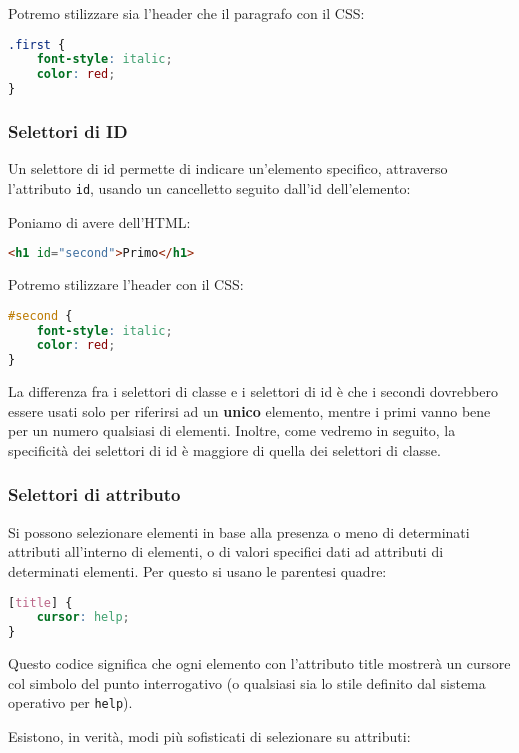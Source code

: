\documentclass[a4paper,11pt]{article}
\begin{document}
Potremo stilizzare sia l'header che il paragrafo con il CSS:
\begin{lstlisting}[language=css, style=codestyle]	
.first {
	font-style: italic;
	color: red;
}
\end{lstlisting}

\subsubsection{Selettori di ID}
Un selettore di id permette di indicare un'elemento specifico, attraverso l'attributo \lstinline|id|, usando un cancelletto seguito dall'id dell'elemento:

Poniamo di avere dell'HTML:
\begin{lstlisting}[language=html, style=codestyle]	
<h1 id="second">Primo</h1>
\end{lstlisting}

Potremo stilizzare l'header con il CSS:
\begin{lstlisting}[language=css, style=codestyle]	
#second {
	font-style: italic;
	color: red;
}
\end{lstlisting}

\par\medskip 

La differenza fra i selettori di classe e i selettori di id è che i secondi dovrebbero essere usati solo per riferirsi ad un \textbf{unico} elemento, mentre i primi vanno bene per un numero qualsiasi di elementi.
Inoltre, come vedremo in seguito, la specificità dei selettori di id è maggiore di quella dei selettori di classe.

\subsubsection{Selettori di attributo}
Si possono selezionare elementi in base alla presenza o meno di determinati attributi all'interno di elementi, o di valori specifici dati ad attributi di determinati elementi. Per questo si usano le parentesi quadre:
\begin{lstlisting}[language=css, style=codestyle]	
[title] {
	cursor: help;
}
\end{lstlisting}
Questo codice significa che ogni elemento con l'attributo title mostrerà un cursore col simbolo del punto interrogativo (o qualsiasi sia lo stile definito dal sistema operativo per \lstinline|help|).

Esistono, in verità, modi più sofisticati di selezionare su attributi:
\end{document}
